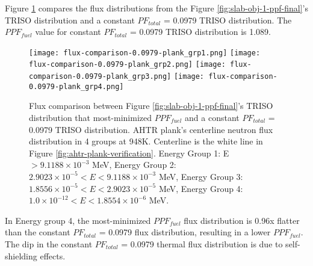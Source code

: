 Figure \ref{fig:flux-comparison-0.0979-plank} compares the flux distributions from the 
Figure \ref{fig:slab-obj-1-ppf-final}'s TRISO distribution and a constant 
$PF_{total}$ = 0.0979 TRISO distribution. 
The $PPF_{fuel}$ value for constant $PF_{total}$ = 0.0979 TRISO distribution is 1.089. 
\begin{figure}[H]
    \centering
    \texttt{[image: flux-comparison-0.0979-plank\_grp1.png]} 
    \texttt{[image: flux-comparison-0.0979-plank\_grp2.png]} 
    \texttt{[image: flux-comparison-0.0979-plank\_grp3.png]} 
    \texttt{[image: flux-comparison-0.0979-plank\_grp4.png]} 
    \caption{Flux comparison between Figure \ref{fig:slab-obj-1-ppf-final}'s TRISO 
    distribution that most-minimized $PPF_{fuel}$ and a constant $PF_{total}$ = 0.0979 
    TRISO distribution. 
    \acrfull{AHTR} plank's centerline neutron flux distribution in 4 groups at 948K. 
    Centerline is the white line in Figure \ref{fig:ahtr-plank-verification}.
    Energy Group 1: E $> 9.1188 \times 10^{-3}$ MeV, 
    Energy Group 2: $2.9023 \times 10^{-5} < E < 9.1188 \times 10^{-3}$ MeV,
    Energy Group 3:  $1.8556 \times 10^{-5} < E < 2.9023 \times 10^{-5}$ MeV,
    Energy Group 4:  $1.0 \times 10^{-12} < E < 1.8554 \times 10^{-6}$ MeV.}
    \label{fig:flux-comparison-0.0979-plank}
\end{figure}
In Energy group 4, the most-minimized $PPF_{fuel}$ flux distribution is 0.96x flatter 
than the constant $PF_{total}$ = 0.0979 flux distribution, resulting in a lower 
$PPF_{fuel}$. 
The dip in the constant $PF_{total}$ = 0.0979 thermal flux distribution is due to 
self-shielding effects. 


